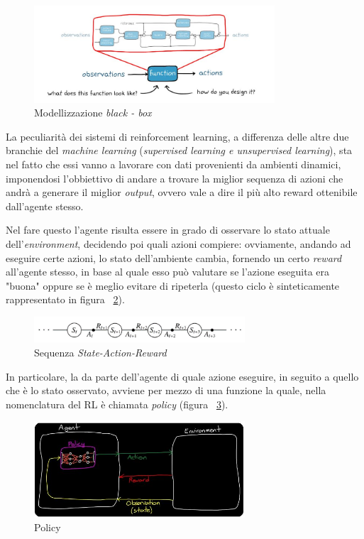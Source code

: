 \begin{figure}[h!]
	\centering
	\includegraphics[width=0.8\textwidth]{Immagini/SqueezingOfControlTheory.JPG}
	\caption{Modellizzazione \textit{black - box}}
	\label{fig:SqueezingOfControlTheory}
\end{figure}

La peculiarità dei sistemi di reinforcement learning, a differenza delle altre due branchie del \textit{machine learning} (\textit{supervised learning e unsupervised learning}), sta nel fatto che essi vanno a lavorare con dati provenienti da ambienti dinamici, imponendosi l'obbiettivo di andare a trovare la miglior sequenza di azioni che andrà a generare il miglior \textit{output}, ovvero vale a dire il più alto reward ottenibile dall'agente stesso.

Nel fare questo l'agente risulta essere in grado di osservare lo stato attuale dell'\textit{environment}, decidendo poi quali azioni compiere: ovviamente, andando ad eseguire certe azioni, lo stato dell'ambiente cambia, fornendo un certo \textit{reward} all'agente stesso, in base al quale esso può valutare se l'azione eseguita era "buona" oppure se è meglio evitare di ripeterla (questo ciclo è sinteticamente rappresentato in figura ~\ref{fig:State_Action_Reward}).

\begin{figure}[h]
	\includegraphics[width=0.7\textwidth]{Immagini/State_Action_Reward.png}
	\caption{Sequenza \textit{State-Action-Reward}}
	\label{fig:State_Action_Reward}
\end{figure}

In particolare, la da parte dell'agente di quale azione eseguire, in seguito a quello che è lo stato osservato, avviene per mezzo di una funzione la quale, nella nomenclatura del RL è chiamata \textit{policy} (figura ~\ref{fig:Policy}).

\begin{figure}[!h]
	\centering
	\includegraphics[width=0.7\textwidth]{Immagini/Policy.JPG}
	\caption{Policy}
	\label{fig:Policy}
\end{figure}

